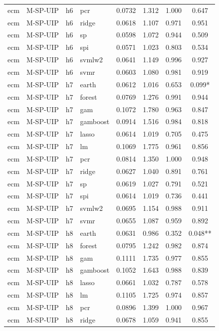 \begin{ThreePartTable}
\begin{longtable}[t]{llclcccc}
ecm & M-SP-UIP & h6 & pcr & 0.0732 & 1.312 & 1.000 & 0.647\\
ecm & M-SP-UIP & h6 & ridge & 0.0618 & 1.107 & 0.971 & 0.951\\
ecm & M-SP-UIP & h6 & sp & 0.0598 & 1.072 & 0.944 & 0.509\\
ecm & M-SP-UIP & h6 & spi & 0.0571 & 1.023 & 0.803 & 0.534\\
ecm & M-SP-UIP & h6 & svmlw2 & 0.0641 & 1.149 & 0.996 & 0.927\\
ecm & M-SP-UIP & h6 & svmr & 0.0603 & 1.080 & 0.981 & 0.919\\
\addlinespace
ecm & M-SP-UIP & h7 & earth & 0.0612 & 1.016 & 0.653 & 0.099*\\
ecm & M-SP-UIP & h7 & forest & 0.0769 & 1.276 & 0.991 & 0.944\\
ecm & M-SP-UIP & h7 & gam & 0.1072 & 1.780 & 0.963 & 0.847\\
ecm & M-SP-UIP & h7 & gamboost & 0.0914 & 1.516 & 0.984 & 0.818\\
ecm & M-SP-UIP & h7 & lasso & 0.0614 & 1.019 & 0.705 & 0.475\\
ecm & M-SP-UIP & h7 & lm & 0.1069 & 1.775 & 0.961 & 0.856\\
ecm & M-SP-UIP & h7 & pcr & 0.0814 & 1.350 & 1.000 & 0.948\\
ecm & M-SP-UIP & h7 & ridge & 0.0627 & 1.040 & 0.891 & 0.761\\
ecm & M-SP-UIP & h7 & sp & 0.0619 & 1.027 & 0.791 & 0.521\\
ecm & M-SP-UIP & h7 & spi & 0.0614 & 1.019 & 0.736 & 0.441\\
ecm & M-SP-UIP & h7 & svmlw2 & 0.0695 & 1.154 & 0.988 & 0.911\\
ecm & M-SP-UIP & h7 & svmr & 0.0655 & 1.087 & 0.959 & 0.892\\
\addlinespace
ecm & M-SP-UIP & h8 & earth & 0.0631 & 0.986 & 0.352 & 0.048**\\
ecm & M-SP-UIP & h8 & forest & 0.0795 & 1.242 & 0.982 & 0.874\\
ecm & M-SP-UIP & h8 & gam & 0.1111 & 1.735 & 0.977 & 0.855\\
ecm & M-SP-UIP & h8 & gamboost & 0.1052 & 1.643 & 0.988 & 0.839\\
ecm & M-SP-UIP & h8 & lasso & 0.0661 & 1.032 & 0.787 & 0.578\\
ecm & M-SP-UIP & h8 & lm & 0.1105 & 1.725 & 0.974 & 0.857\\
ecm & M-SP-UIP & h8 & pcr & 0.0896 & 1.399 & 1.000 & 0.967\\
ecm & M-SP-UIP & h8 & ridge & 0.0678 & 1.059 & 0.941 & 0.855\\

\end{longtable}
\end{ThreePartTable}
